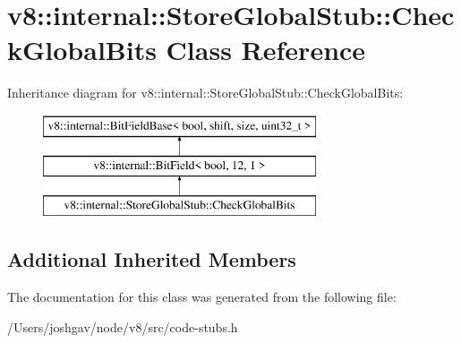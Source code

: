 \hypertarget{classv8_1_1internal_1_1_store_global_stub_1_1_check_global_bits}{}\section{v8\+:\+:internal\+:\+:Store\+Global\+Stub\+:\+:Check\+Global\+Bits Class Reference}
\label{classv8_1_1internal_1_1_store_global_stub_1_1_check_global_bits}
Inheritance diagram for v8\+:\+:internal\+:\+:Store\+Global\+Stub\+:\+:Check\+Global\+Bits\+:\begin{figure}[H]
\begin{center}
\leavevmode
\includegraphics[height=3.000000cm]{classv8_1_1internal_1_1_store_global_stub_1_1_check_global_bits}
\end{center}
\end{figure}
\subsection*{Additional Inherited Members}


The documentation for this class was generated from the following file\+:\begin{DoxyCompactItemize}
\item 
/\+Users/joshgav/node/v8/src/code-\/stubs.\+h\end{DoxyCompactItemize}
